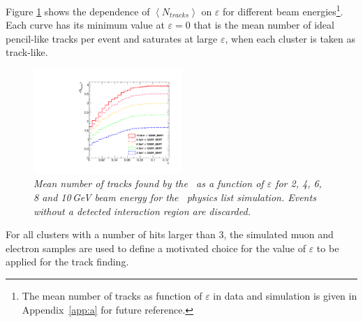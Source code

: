Figure \ref{fig:epsilonsys} shows the dependence of $\left<N_{tracks}\right>$ on $\varepsilon$ for different beam energies\footnote{\label{note3}The mean number of tracks as function of $\varepsilon$ in data and simulation is given in Appendix~\ref{app:a} for future reference.}.
Each curve has its minimum value at $\varepsilon = 0$ that is the mean number of ideal pencil-like tracks per event and saturates at large $\varepsilon$, when each cluster is taken as track-like.  
\begin{figure}[H]
	\centering
	\includegraphics[width=0.5\textwidth]{ECAL/plots/comparison.pdf}
	\caption{\label{fig:epsilonsys} \sl Mean number of tracks found by the \tfa\ as a function of $\varepsilon$ for 2, 4, 6, 8 and 10\,GeV beam energy for the \qgsp\ physics list simulation. Events without a detected interaction region are discarded.}
\end{figure}

For all clusters with a number of hits larger than 3, the simulated muon and electron samples are used to define a motivated choice for the value of  $\varepsilon$ to be applied for the track finding. 

